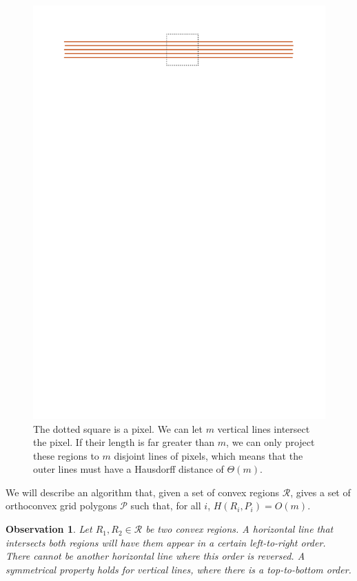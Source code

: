 \documentclass[a4paper, 11pt]{article}
\newtheorem{observation}{Observation}
\begin{document}
\begin{figure}
\centering
\includegraphics[scale=0.8]{Figures/linesexample.pdf}
\caption{The dotted square is a pixel. We can let $m$ vertical lines intersect the pixel. If their length is far greater than $m$, we can only project these regions to $m$ disjoint lines of pixels, which means that the outer lines must have a Hausdorff distance of $\Theta(m)$.}
\label{fig:linesexample}
\end{figure}

We will describe an algorithm that, given a set of convex regions \(\mathcal{R}\), gives a set of orthoconvex grid polygons \(\mathcal{P}\) such that, for all \(i\), \(H(R_i, P_i) = O(m)\).

\begin{observation}\label{obs:convex-ordering}
Let \(R_1,R_2 \in \mathcal{R}\) be two convex regions. A horizontal line that intersects both regions will have them appear in a certain left-to-right order. There cannot be another horizontal line where this order is reversed. A symmetrical property holds for vertical lines, where there is a top-to-bottom order.
\end{observation}
\end{document}
